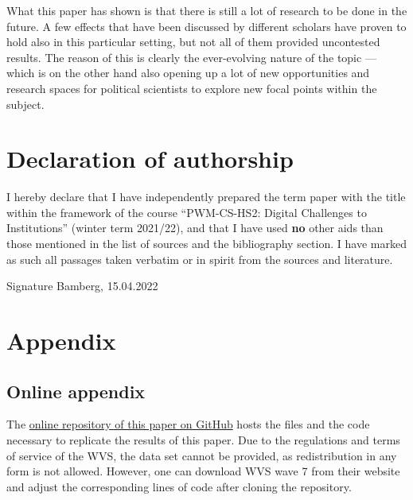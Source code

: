 \documentclass[
  12pt,
  english,
]{article}
\begin{document}
What this paper has shown is that there is still a lot of research to be
done in the future. A few effects that have been discussed by different
scholars have proven to hold also in this particular setting, but not
all of them provided uncontested results. The reason of this is clearly
the ever-evolving nature of the topic --- which is on the other hand
also opening up a lot of new opportunities and research spaces for
political scientists to explore new focal points within the subject.

\newpage{}

\hypertarget{declaration-of-authorship}{%
\section{Declaration of authorship}\label{declaration-of-authorship}}

I hereby declare that I have independently prepared the term paper with
the title within the framework of the course ``PWM-CS-HS2: Digital
Challenges to Institutions'' (winter term 2021/22), and that I have used
\textbf{no} other aids than those mentioned in the list of sources and
the bibliography section. I have marked as such all passages taken
verbatim or in spirit from the sources and literature.

\vfill

Signature \hfill Bamberg, 15.04.2022

\newpage{}

\hypertarget{appendix}{%
\section{Appendix}\label{appendix}}

\hypertarget{online-appendix}{%
\subsection{Online appendix}\label{online-appendix}}

The \href{https://github.com/FWisniewski44/digital-challenges}{online
repository of this paper on GitHub} hosts the files and the code
necessary to replicate the results of this paper. Due to the regulations
and terms of service of the WVS, the data set cannot be provided, as
redistribution in any form is not allowed. However, one can download WVS
wave 7 from their website and adjust the corresponding lines of code
after cloning the repository.

\clearpage
\end{document}
